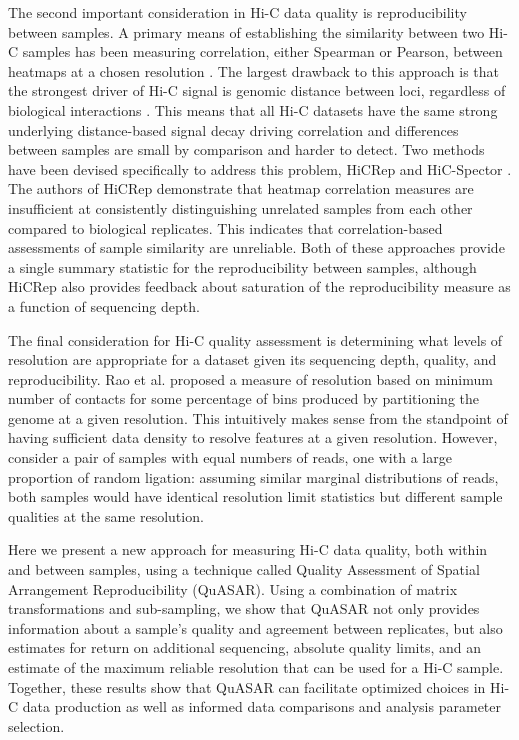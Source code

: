 The second important consideration in Hi-C data quality is reproducibility between samples. A primary means of establishing the similarity between two Hi-C samples has been measuring correlation, either Spearman or Pearson, between heatmaps at a chosen resolution \cite{hou_gene_2012,battulin_comparison_2015,crane_condensin-driven_2015,li_widespread_2015,nagano_comparison_2015,rao_3d_2014}. The largest drawback to this approach is that the strongest driver of Hi-C signal is genomic distance between loci, regardless of biological interactions \cite{lieberman-aiden_comprehensive_2009}. This means that all Hi-C datasets have the same strong underlying distance-based signal decay driving correlation and differences between samples are small by comparison and harder to detect. Two methods have been devised specifically to address this problem, HiCRep \cite{yang_hicrep:_2017} and HiC-Spector \cite{yan_hic-spector:_2017}. The authors of HiCRep demonstrate that heatmap correlation measures are insufficient at consistently distinguishing unrelated samples from each other compared to biological replicates. This indicates that correlation-based assessments of sample similarity are unreliable. Both of these approaches provide a single summary statistic for the reproducibility between samples, although HiCRep also provides feedback about saturation of the reproducibility measure as a function of sequencing depth.

The final consideration for Hi-C quality assessment is determining what levels of resolution are appropriate for a dataset given its sequencing depth, quality, and reproducibility. Rao et al. \cite{rao_3d_2014} proposed a measure of resolution based on minimum number of contacts for some percentage of bins produced by partitioning the genome at a given resolution. This intuitively makes sense from the standpoint of having sufficient data density to resolve features at a given resolution. However, consider a pair of samples with equal numbers of reads, one with a large proportion of random ligation: assuming similar marginal distributions of reads, both samples would have identical resolution limit statistics but different sample qualities at the same resolution.

Here we present a new approach for measuring Hi-C data quality, both within and between samples, using a technique called Quality Assessment of Spatial Arrangement Reproducibility (QuASAR). Using a combination of matrix transformations and sub-sampling, we show that QuASAR not only provides information about a sample's quality and agreement between replicates, but also estimates for return on additional sequencing, absolute quality limits, and an estimate of the maximum reliable resolution that can be used for a Hi-C sample. Together, these results show that QuASAR can facilitate optimized choices in Hi-C data production as well as informed data comparisons and analysis parameter selection.

